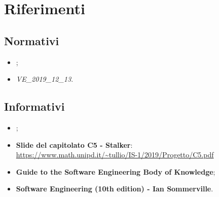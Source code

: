 \section{Riferimenti}

\subsection{Normativi}
\begin{itemize}
\item {};
\item \textit{VE\_2019\_12\_13}.
\end{itemize}

\subsection{Informativi}
\begin{itemize}
\item {};
\item \textbf{Slide del capitolato C5 - Stalker}: \\ \url{https://www.math.unipd.it/~tullio/IS-1/2019/Progetto/C5.pdf}
\item \textbf{Guide to the Software Engineering Body of Knowledge};
\item \textbf{Software Engineering (10th edition) - Ian Sommerville}.
\end{itemize}
